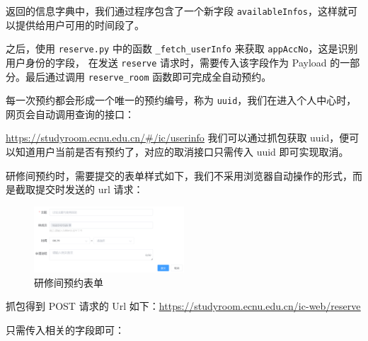 \documentclass[14pt,a4paper,UTF8,twoside]{article}
\begin{document}
返回的信息字典中，我们通过程序包含了一个新字段 \texttt{availableInfos}，这样就可以提供给用户可用的时间段了。

之后，使用 \texttt{reserve.py} 中的函数 \texttt{\_fetch\_userInfo} 来获取 \texttt{appAccNo}，这是识别用户身份的字段，
在发送 \texttt{reserve} 请求时，需要传入该字段作为 Payload 的一部分。最后通过调用 \texttt{reserve\_room} 函数即可完成全自动预约。

\begin{note}
每一次预约都会形成一个唯一的预约编号，称为 \texttt{uuid}，我们在进入个人中心时，网页会自动调用查询的接口：

\href{https://studyroom.ecnu.edu.cn/#/ic/userinfo}{\underline{https://studyroom.ecnu.edu.cn/\#/ic/userinfo}}
我们可以通过抓包获取 uuid，便可以知道用户当前是否有预约了，对应的取消接口只需传入 uuid 即可实现取消。
\end{note}

研修间预约时，需要提交的表单样式如下，我们不采用浏览器自动操作的形式，而是截取提交时发送的 url 请求：

\begin{figure}[H]
    \centering
    \includegraphics[width=0.5\textwidth]{img/studyroom_submit.png}
    \caption{研修间预约表单}
    \label{fig:studyroom_reserve}
\end{figure}

抓包得到 POST 请求的 Url 如下：\href{https://studyroom.ecnu.edu.cn/ic-web/reserve}{\underline{https://studyroom.ecnu.edu.cn/ic-web/reserve}}

只需传入相关的字段即可：
\end{document}
